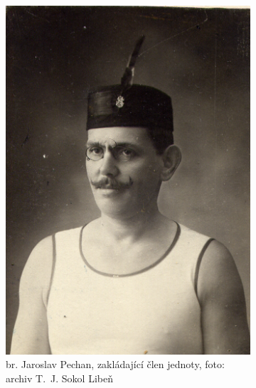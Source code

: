 \documentclass[a5paper, 12pt, twoside]{article}
\begin{document}
\begin{figure}[h]
  \centering
  \begin{subfigure}{0.45\textwidth}
  \includegraphics[width=\textwidth]{img/pechan.jpg}
  \caption*{br. Jaroslav Pechan, zakládající člen jednoty, foto: archiv T.~J. Sokol Libeň}
  \end{subfigure}
  \hfill
  \begin{subfigure}{0.45\textwidth}

\end{subfigure}
\end{figure}
\end{document}
